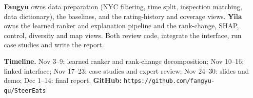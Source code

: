\documentclass[10pt]{article}
\begin{document}
\textbf{Fangyu} owns data preparation (NYC filtering, time split, inspection matching, data dictionary), the baselines,
and the rating-history and coverage views. \textbf{Yila} owns the learned ranker and explanation pipeline and the
rank-change, SHAP, control, diversity and map views. Both review code, integrate the interface, run case
studies and write the report.

\textbf{Timeline.} Nov 3--9: learned ranker and rank-change decomposition; Nov 10--16: linked interface;
Nov 17--23: case studies and expert review; Nov 24--30: slides and demo; Dec 1--14: final report.
\textbf{GitHub:} \texttt{https://github.com/fangyu-qu/SteerEats}
\end{document}
